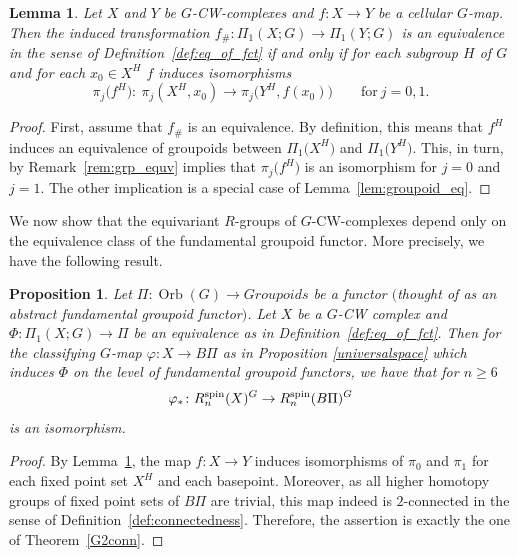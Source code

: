 \documentclass[pdftex]{sigma}
\numberwithin{equation}{section}
\newtheorem{Lemma}[Theorem]{Lemma}
\newtheorem{Proposition}[Theorem]{Proposition}
{ \theoremstyle{definition}
	\newtheorem{Definition}[Theorem]{Definition}
	\newtheorem{Note}[Theorem]{Note}
	\newtheorem{Example}[Theorem]{Example}
	\newtheorem{Remark}[Theorem]{Remark} }
\DeclareMathOperator{\Orb}{Orb}
\begin{document}
	\begin{Lemma}\label{lem:gpd_to_pi1}
		Let $X$ and $Y$ be $G$-CW-complexes and $f\colon X\to Y$ be a cellular
		$G$-map. Then the induced transformation
	$
			f_\# \colon \Pi_1(X;G) \to \Pi_1(Y;G)
	$
		is an equivalence in the sense of Definition~{\rm\ref{def:eq_of_fct}}
		if and only if for each subgroup $H$ of $G$ and for each $x_0\in X^H$
		$f$ induces isomorphisms
		\begin{equation*}
			\pi_j\bigl(f^H\bigr)\colon\ \pi_j(X^H, x_0)\to \pi_j\bigl(Y^H, f(x_0)\bigr) \qquad\text{for} \ j=0,1.
		\end{equation*}
	\end{Lemma}
	\begin{proof}
		First, assume that $f_\#$ is an equivalence. By definition, this means that
		$f^H$ induces an equivalence of groupoids between $\Pi_1\bigl(X^H\bigr)$ and
		$\Pi_1\bigl(Y^H\bigr)$. This, in turn, by Remark~\ref{rem:grp_equv} implies that
		$\pi_j\bigl(f^H\bigr)$ is an isomorphism for $j=0$ and $j=1$.
		The other implication is a special case of Lemma~\ref{lem:groupoid_eq}.
	\end{proof}
	
We now show that the equivariant $R$-groups of $G$-CW-complexes depend only on
	the equivalence class of the fundamental groupoid functor. More precisely, we have the following result.
	
	\begin{Proposition}\label{corol:R_dependence}
		Let $\Pi\colon \Orb(G)\to Groupoids$ be a functor $($thought of as an abstract
		fundamental groupoid functor$)$. Let $X$ be a $G$-CW complex
		and $\Phi\colon \Pi_1(X;G)\to \Pi$ be an equivalence as in Definition~{\rm\ref{def:eq_of_fct}}.
Then for the classifying $G$-map $\varphi\colon X\to B\Pi$ as in Proposition
		{\rm\ref{universalspace}} which induces $\Phi$ on the level of fundamental groupoid
		functors, we have that for $n\ge 6$
		\[%
			\varphi_* \colon R_{n}^{\rm spin}(X)^{G} \rightarrow R_{n}^{\rm spin}(B \Pi)^{G}
		\]
		is an isomorphism.
	\end{Proposition}	
	\begin{proof}
		By Lemma~\ref{lem:gpd_to_pi1}, the map $f\colon X\to Y$ induces isomorphisms
		of $\pi_0$ and $\pi_1$ for each fixed point set $X^H$ and each
		basepoint. Moreover, as all higher homotopy groups of fixed point sets of
		$B\Pi$ are trivial, this map indeed is $2$-connected
		in the sense of Definition~\ref{def:connectedness}.
		Therefore, the assertion is exactly the one of Theorem~\ref{G2conn}.
	\end{proof}
	
\end{document}
